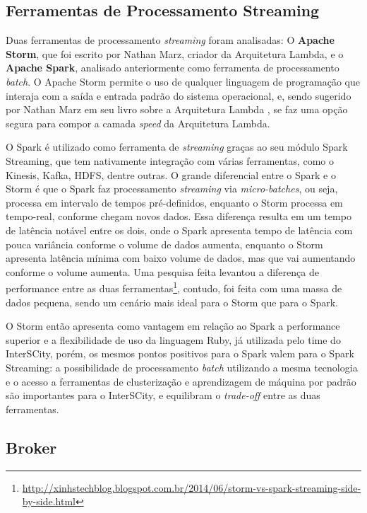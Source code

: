 \subsection{Ferramentas de Processamento Streaming}

Duas ferramentas de processamento \textit{streaming} foram analisadas: O
\textbf{Apache Storm}, que foi escrito por Nathan Marz, criador da Arquitetura
Lambda, e o \textbf{Apache Spark}, analisado anteriormente como ferramenta de
processamento \textit{batch}. O Apache Storm permite o uso de qualquer
linguagem de programação que interaja com a saída e entrada padrão do sistema
operacional, e, sendo sugerido por Nathan Marz em seu livro sobre a Arquitetura
Lambda \cite{marz2015}, se faz uma opção segura para compor a camada
\textit{speed} da Arquitetura Lambda.

O Spark é utilizado como ferramenta de \textit{streaming} graças ao seu módulo
Spark Streaming, que tem nativamente integração com várias ferramentas, como
o Kinesis, Kafka, HDFS, dentre outras. O grande diferencial entre o Spark e o
Storm é que o Spark faz processamento \textit{streaming} via
\textit{micro-batches}, ou seja, processa em intervalo de tempos
pré-definidos, enquanto o Storm processa em tempo-real, conforme chegam novos
dados. Essa diferença resulta em um tempo de latência notável entre os dois,
onde o Spark apresenta tempo de latência com pouca variância conforme o volume
de dados aumenta, enquanto o Storm apresenta latência mínima com baixo volume
de dados, mas que vai aumentando conforme o volume aumenta. Uma pesquisa
feita levantou a diferença de performance entre as duas
ferramentas\footnote{\url{http://xinhstechblog.blogspot.com.br/2014/06/storm-vs-spark-streaming-side-by-side.html}},
contudo, foi feita com uma massa de dados pequena, sendo um cenário mais ideal
para o Storm que para o Spark.

O Storm então apresenta como vantagem em relação ao Spark a performance
superior e a flexibilidade de uso da linguagem Ruby, já utilizada pelo time
do InterSCity, porém, os mesmos pontos positivos para o Spark valem para o
Spark Streaming: a possibilidade de processamento \textit{batch} utilizando
a mesma tecnologia e o acesso a ferramentas de clusterização e aprendizagem de
máquina por padrão são importantes para o InterSCity, e equilibram o
\textit{trade-off} entre as duas ferramentas.

\subsection{Broker}

